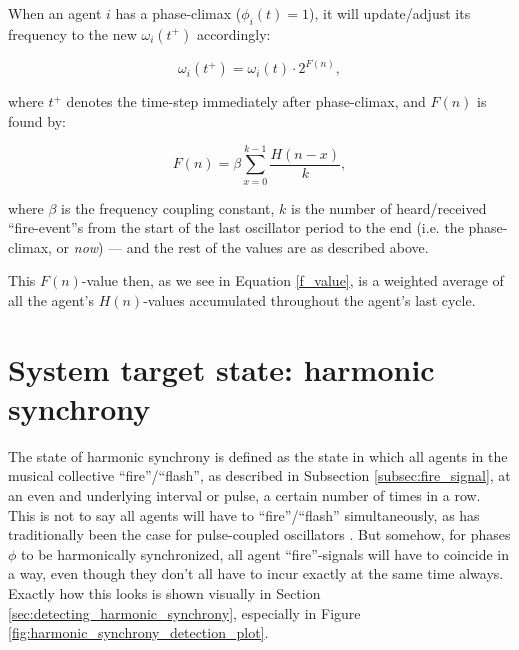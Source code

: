 	When an agent $i$ has a phase-climax ($\phi_i(t)=1$), it will update/adjust its frequency to the new $\omega_i(t^+)$ accordingly:

	\begin{equation}
	\label{freq_adj}
		\omega_i(t^+) = \omega_i(t) \cdot 2^{F(n)},
	\end{equation}

	where $t^+$ denotes the time-step immediately after phase-climax, and $F(n)$ is found by:

	\begin{equation}
	\label{f_value}
		F(n) = \beta\sum_{x=0}^{k-1}\frac{H(n-x)}{k},
	\end{equation}

	where $\beta$ is the frequency coupling constant, $k$ is the number of heard/received ``fire-event''s from the start of the last oscillator period to the end (i.e. the phase-climax, or \textit{now}) — and the rest of the values are as described above.

	This $F(n)$-value then, as we see in Equation \eqref{f_value}, is a weighted average of all the agent's $H(n)$-values accumulated throughout the agent's last cycle.




\section{System target state: harmonic synchrony}
\label{sec:harmonic_synchrony}






The state of harmonic synchrony is defined \cite{nymoen_synch} as the state in which all agents in the musical collective ``fire''/``flash'', as described in Subsection \ref{subsec:fire_signal}, at an even and underlying interval or pulse, a certain number of times in a row. This is not to say all agents will have to ``fire''/``flash'' simultaneously, as has traditionally been the case for pulse-coupled oscillators \cite{}. But somehow, for phases $\phi$ to be harmonically synchronized, all agent ``fire''-signals will have to coincide in a way, even though they don't all have to incur exactly at the same time always. Exactly how this looks is shown visually in Section \ref{sec:detecting_harmonic_synchrony}, especially in Figure \ref{fig:harmonic_synchrony_detection_plot}.

